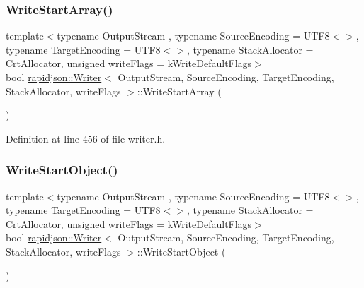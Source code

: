 \subsubsection{\texorpdfstring{WriteStartArray()}{WriteStartArray()}}
{\footnotesize\ttfamily template$<$typename Output\+Stream , typename Source\+Encoding  = U\+T\+F8$<$$>$, typename Target\+Encoding  = U\+T\+F8$<$$>$, typename Stack\+Allocator  = Crt\+Allocator, unsigned write\+Flags = k\+Write\+Default\+Flags$>$ \\
bool \mbox{\hyperlink{classrapidjson_1_1_writer}{rapidjson\+::\+Writer}}$<$ Output\+Stream, Source\+Encoding, Target\+Encoding, Stack\+Allocator, write\+Flags $>$\+::Write\+Start\+Array (\begin{DoxyParamCaption}{ }\end{DoxyParamCaption})\hspace{0.3cm}{\ttfamily [protected]}}



Definition at line 456 of file writer.\+h.


\begin{DoxyCode}{0}
\DoxyCodeLine{456 \{ \mbox{\hyperlink{classrapidjson_1_1_writer_a1370d3fd6728d4f0b3f20d734bb27eaf}{os\_}}->Put(\textcolor{charliteral}{'['}); \textcolor{keywordflow}{return} \textcolor{keyword}{true}; \}}

\end{DoxyCode}
\mbox{\label{classrapidjson_1_1_writer_aed07aaa7245d5e607933a75c634921f9}} 
\subsubsection{\texorpdfstring{WriteStartObject()}{WriteStartObject()}}
{\footnotesize\ttfamily template$<$typename Output\+Stream , typename Source\+Encoding  = U\+T\+F8$<$$>$, typename Target\+Encoding  = U\+T\+F8$<$$>$, typename Stack\+Allocator  = Crt\+Allocator, unsigned write\+Flags = k\+Write\+Default\+Flags$>$ \\
bool \mbox{\hyperlink{classrapidjson_1_1_writer}{rapidjson\+::\+Writer}}$<$ Output\+Stream, Source\+Encoding, Target\+Encoding, Stack\+Allocator, write\+Flags $>$\+::Write\+Start\+Object (\begin{DoxyParamCaption}{ }\end{DoxyParamCaption})\hspace{0.3cm}{\ttfamily [protected]}}



